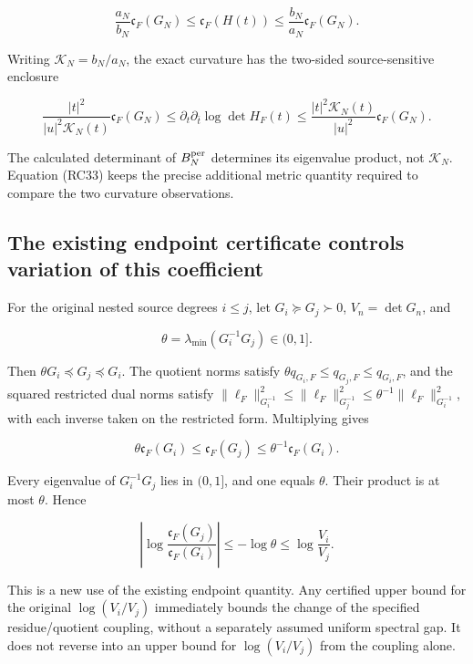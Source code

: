 \documentclass[
  11pt,
]{article}
\begin{document}
\[
\frac{a_N}{b_N}\mathfrak c_F(G_N)
\leq\mathfrak c_F(H(t))
\leq\frac{b_N}{a_N}\mathfrak c_F(G_N).
\tag{RC32}
\]

Writing \(\mathcal K_N=b_N/a_N\), the exact curvature has the two-sided
source-sensitive enclosure

\[
\boxed{\frac{|t|^2}{|u|^2\mathcal K_N(t)}\mathfrak c_F(G_N)
\leq\partial_t\partial_{\bar t}\log\det H_F(t)
\leq\frac{|t|^2\mathcal K_N(t)}{|u|^2}\mathfrak c_F(G_N).}
\tag{RC33}
\]

The calculated determinant of \(B_N^{\rm per}\) determines its
eigenvalue product, not \(\mathcal K_N\). Equation (RC33) keeps the
precise additional metric quantity required to compare the two curvature
observations.

\subsection{The existing endpoint certificate controls variation of this
coefficient}\label{the-existing-endpoint-certificate-controls-variation-of-this-coefficient}

For the original nested source degrees \(i\leq j\), let
\(G_i\succeq G_j\succ0\), \(V_n=\det G_n\), and

\[
\theta=\lambda_{\min}(G_i^{-1}G_j)\in(0,1].
\tag{RC34}
\]

Then \(\theta G_i\preceq G_j\preceq G_i\). The quotient norms satisfy
\(\theta q_{G_i,F}\leq q_{G_j,F}\leq q_{G_i,F}\), and the squared
restricted dual norms satisfy
\(\|\ell_F\|_{G_i^{-1}}^2\leq\|\ell_F\|_{G_j^{-1}}^2
\leq\theta^{-1}\|\ell_F\|_{G_i^{-1}}^2\), with each inverse taken on the
restricted form. Multiplying gives

\[
\theta\mathfrak c_F(G_i)\leq\mathfrak c_F(G_j)
\leq\theta^{-1}\mathfrak c_F(G_i).
\tag{RC35}
\]

Every eigenvalue of \(G_i^{-1}G_j\) lies in \((0,1]\), and one equals
\(\theta\). Their product is at most \(\theta\). Hence

\[
\boxed{\left|\log\frac{\mathfrak c_F(G_j)}{\mathfrak c_F(G_i)}\right|
\leq-\log\theta\leq\log\frac{V_i}{V_j}.}
\tag{RC36}
\]

This is a new use of the existing endpoint quantity. Any certified upper
bound for the original \(\log(V_i/V_j)\) immediately bounds the change
of the specified residue/quotient coupling, without a separately assumed
uniform spectral gap. It does not reverse into an upper bound for
\(\log(V_i/V_j)\) from the coupling alone.
\end{document}
